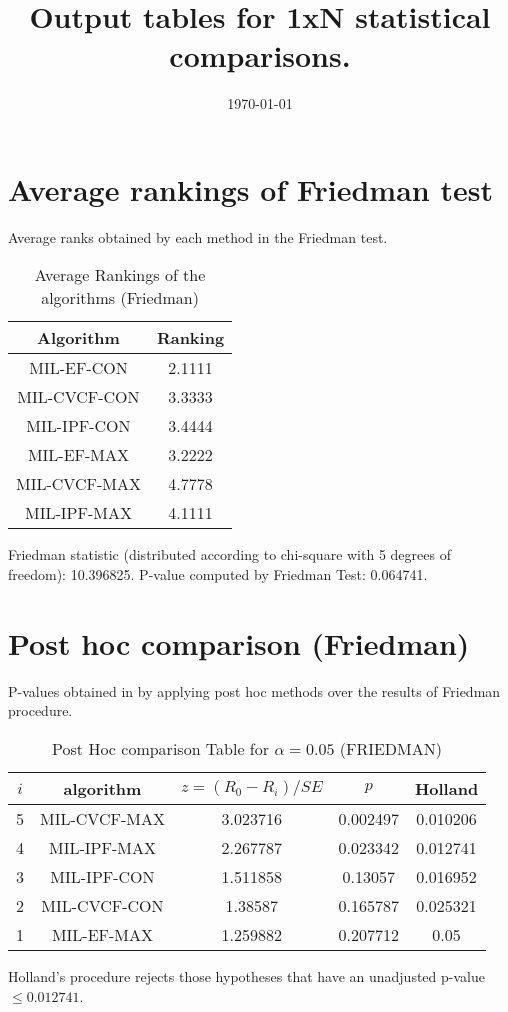 \documentclass[a4paper,10pt]{article}
\title{Output tables for 1xN statistical comparisons.}
\author{}
\date{\today}
\begin{document}
\begin{landscape}
\pagestyle{empty}
\maketitle
\thispagestyle{empty}

\section{Average rankings of Friedman test}


Average ranks obtained by each method in the Friedman test.

\begin{table}[!htp]
\centering
\begin{tabular}{|c|c|}\hline
Algorithm&Ranking\\\hline
MIL-EF-CON&2.1111\\MIL-CVCF-CON&3.3333\\MIL-IPF-CON&3.4444\\MIL-EF-MAX&3.2222\\MIL-CVCF-MAX&4.7778\\MIL-IPF-MAX&4.1111\\\hline\end{tabular}
\caption{Average Rankings of the algorithms (Friedman)}
\end{table}

Friedman statistic (distributed according to chi-square with 5 degrees of freedom): 10.396825. \newline P-value computed by Friedman Test: 0.064741.\newline


\newpage

\section{Post hoc comparison (Friedman)}


P-values obtained in by applying post hoc methods over the results of Friedman procedure.

\begin{table}[!htp]
\centering\footnotesize
\begin{tabular}{ccccc}
$i$&algorithm&$z=(R_0 - R_i)/SE$&$p$&Holland\\
\hline5&MIL-CVCF-MAX&3.023716&0.002497&0.010206\\4&MIL-IPF-MAX&2.267787&0.023342&0.012741\\3&MIL-IPF-CON&1.511858&0.13057&0.016952\\2&MIL-CVCF-CON&1.38587&0.165787&0.025321\\1&MIL-EF-MAX&1.259882&0.207712&0.05\\\hline
\end{tabular}
\caption{Post Hoc comparison Table for $\alpha=0.05$ (FRIEDMAN)}
\end{table}Holland's procedure rejects those hypotheses that have an unadjusted p-value $\le0.012741$.



\end{landscape}
\end{document}
